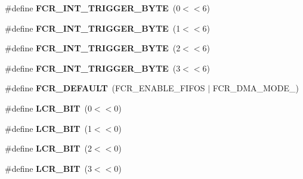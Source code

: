 \begin{DoxyCompactItemize}
\item 
\hypertarget{group__hal__dos_gafb61755694cecd05881690c0c3f3654f}{\#define {\bfseries F\-C\-R\-\_\-\-I\-N\-T\-\_\-\-T\-R\-I\-G\-G\-E\-R\-\_\-B\-Y\-T\-E}~(0$<$$<$6)}\label{group__hal__dos_gafb61755694cecd05881690c0c3f3654f}

\item 
\hypertarget{group__hal__dos_gaa16e7c8893fa44bb53381f93cbc2ba27}{\#define {\bfseries F\-C\-R\-\_\-\-I\-N\-T\-\_\-\-T\-R\-I\-G\-G\-E\-R\-\_\-B\-Y\-T\-E}~(1$<$$<$6)}\label{group__hal__dos_gaa16e7c8893fa44bb53381f93cbc2ba27}

\item 
\hypertarget{group__hal__dos_gabeabe9b8e7dd748b99ffa6472fe0b3ef}{\#define {\bfseries F\-C\-R\-\_\-\-I\-N\-T\-\_\-\-T\-R\-I\-G\-G\-E\-R\-\_\-B\-Y\-T\-E}~(2$<$$<$6)}\label{group__hal__dos_gabeabe9b8e7dd748b99ffa6472fe0b3ef}

\item 
\hypertarget{group__hal__dos_gaed94cd04e976b03515a43d6b8cbf805d}{\#define {\bfseries F\-C\-R\-\_\-\-I\-N\-T\-\_\-\-T\-R\-I\-G\-G\-E\-R\-\_\-B\-Y\-T\-E}~(3$<$$<$6)}\label{group__hal__dos_gaed94cd04e976b03515a43d6b8cbf805d}

\item 
\hypertarget{group__hal__dos_ga733e75579da0032be20c7fd6ac33944e}{\#define {\bfseries F\-C\-R\-\_\-\-D\-E\-F\-A\-U\-L\-T}~(F\-C\-R\-\_\-\-E\-N\-A\-B\-L\-E\-\_\-\-F\-I\-F\-O\-S $|$ F\-C\-R\-\_\-\-D\-M\-A\-\_\-\-M\-O\-D\-E\-\_)}\label{group__hal__dos_ga733e75579da0032be20c7fd6ac33944e}

\item 
\hypertarget{group__hal__dos_ga4f14e7d3fd79b40ca1405245e0242f3b}{\#define {\bfseries L\-C\-R\-\_\-B\-I\-T}~(0$<$$<$0)}\label{group__hal__dos_ga4f14e7d3fd79b40ca1405245e0242f3b}

\item 
\hypertarget{group__hal__dos_ga28e5afbb0dd71482c103d76ba8ccdda6}{\#define {\bfseries L\-C\-R\-\_\-B\-I\-T}~(1$<$$<$0)}\label{group__hal__dos_ga28e5afbb0dd71482c103d76ba8ccdda6}

\item 
\hypertarget{group__hal__dos_ga9578b66996a3790b53955c9a42ef43ab}{\#define {\bfseries L\-C\-R\-\_\-B\-I\-T}~(2$<$$<$0)}\label{group__hal__dos_ga9578b66996a3790b53955c9a42ef43ab}

\item 
\hypertarget{group__hal__dos_ga11849794cd90dedfc1d211cf948b0a3f}{\#define {\bfseries L\-C\-R\-\_\-B\-I\-T}~(3$<$$<$0)}\label{group__hal__dos_ga11849794cd90dedfc1d211cf948b0a3f}


\end{DoxyCompactItemize}
